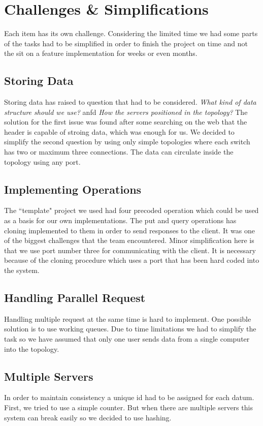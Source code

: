 \documentclass[sigconf,natbib=false]{acmart}
\begin{document}
\section{Challenges \& Simplifications}
Each item has its own challenge. Considering the limited time we had some parts of the tasks had to be simplified in order to finish the project on time and not the sit on a feature implementation  for weeks or even months.
\subsection{Storing Data}
Storing data has raised to question that had to be considered. \textit{What kind of data structure should we use?} anfd \textit{How the servers positioned in the topology?} The solution for the first issue was found after some searching on the web that the header is capable of stroing data, which was enough for us. We decided to simplify the second question by using only simple topologies where each switch has two or maximum three connections. The data can circulate inside the topology using any port.
\subsection{Implementing Operations}
The ``template" project we used had four precoded operation which could be used as a basis for our own implementations. The put and query operations has cloning implemented to them in order to send responses to the client. It was one of the biggest challenges that the team encountered. Minor simplification here is that we use port number three for communicating with the client. It is necessary because of the cloning procedure which uses a port that has been hard coded into the system.
\subsection{Handling Parallel Request}
Handling multiple request at the same time is hard to implement. One possible solution is to use working queues. Due to time limitations we had to simplify the task so we have assumed that only one user sends data from a single computer into the topology.
\subsection{Multiple Servers}
In order to maintain consistency a unique id had to be assigned for each datum. First, we tried to use a simple counter. But when there are multiple servers this system can break easily so we decided to use hashing.
\end{document}
